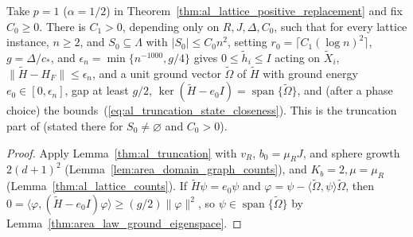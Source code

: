 \begin{lemma}
    \label{thm:al_lattice_truncation}
    \leanok
    Take $p=1$ ($\alpha=1/2$) in
    Theorem~\ref{thm:al_lattice_positive_replacement} and fix $C_0\ge0$. There
    is $C_1>0$, depending only on $R,J,\Delta,C_0$, such that for every lattice
    instance, $n\ge2$, and $S_0\subseteq\Lambda$ with $|S_0|\le C_0n^2$, setting
    $r_0=\lceil C_1(\log n)^2\rceil$, $g=\Delta/c_*$, and
    $\epsilon_n=\min\{n^{-1000},g/4\}$ gives $0\le\widetilde h_i\le I$ acting on
    $\widetilde X_i$, $\|\widetilde H-H_F\|\le\epsilon_n$, and a unit ground
    vector $\widetilde\Omega$ of $\widetilde H$ with ground energy
    $e_0\in[0,\epsilon_n]$, gap at least $g/2$,
    $\ker(\widetilde H-e_0I)=\operatorname{span}\{\widetilde\Omega\}$, and (after
    a phase choice) the bounds~(\ref{eq:al_truncation_state_closeness}). This is
    the truncation part of \cite[Proposition~4.5]{OpenAI2026AreaLaw} (stated
    there for $S_0\ne\varnothing$ and $C_0>0$).
\end{lemma}
\begin{proof}\leanok
    Apply Lemma~\ref{thm:al_truncation} with $v_R$, $b_0=\mu_RJ$, and sphere
    growth $2(d+1)^2$ (Lemma~\ref{lem:area_domain_graph_counts}), and
    $K_b=2,\mu=\mu_R$ (Lemma~\ref{thm:al_lattice_counts}). If
    $\widetilde H\psi=e_0\psi$ and
    $\varphi=\psi-\langle\widetilde\Omega,\psi\rangle\widetilde\Omega$, then
    $0=\langle\varphi,(\widetilde H-e_0I)\varphi\rangle\ge(g/2)\|\varphi\|^2$,
    so $\psi\in\operatorname{span}\{\widetilde\Omega\}$ by
    Lemma~\ref{thm:area_law_ground_eigenspace}.
\end{proof}

